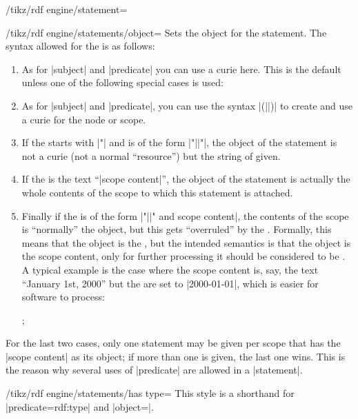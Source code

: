 \begin{key}{/tikz/rdf engine/statement=}
    \begin{key}{/tikz/rdf engine/statements/object=}
        Sets the object for the statement. The syntax allowed for the
         is as follows:
        \begin{enumerate}
            \item As for |subject| and |predicate| you can use a curie here.
                This is the default unless one of the following special cases
                is used:
            \item As for |subject| and |predicate|, you can use the syntax
                |(||)| to create and use a curie
                for the node or scope.
            \item If the  starts with |"| and is of the form
                |"||"|, the object of the
                statement is not a curie (not a normal ``resource'') but the
                string of  given.
            \item If the  is the text ``|scope content|'', the
                object of the statement is actually the whole contents of the
                scope to which this statement is attached.
            \item Finally if the  is of the form
                |"||" and scope content|, the contents of the
                scope is ``normally'' the
                object, but this gets ``overruled'' by the .
                Formally, this means that the object is the ,
                but the intended semantics is that the object is the scope
                content, only for further processing it should be considered to
                be . A typical example is the case where the
                scope content is, say, the text ``January 1st, 2000'' but the
                 are set to |2000-01-01|, which is easier for
                software to process:
\begin{codeexample}
;
\end{codeexample}
        \end{enumerate}
        For the last two cases, only one statement may be given per scope that
        has the |scope content| as its object; if more than one is given, the
        last one wins. This is the reason why several uses of |predicate| are
        allowed in a |statement|.
    \end{key}

    \begin{key}{/tikz/rdf engine/statements/has type=}
        This style is a shorthand for |predicate=rdf:type| and
        |object=|.
    \end{key}
\end{key}


